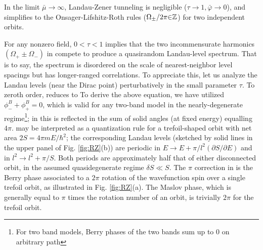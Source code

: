\documentclass[aps, prb, showpacs, twocolumn, notitlepage, superscriptaddress]{revtex4-1}
\begin{document}
In the limit $\bar{\mu}{\rightarrow} \infty$, Landau-Zener tunneling is negligible ($\tau{\rightarrow}1,\bar{\varphi}{\rightarrow}0$), and  simplifies to the Onsager-Lifshitz-Roth rules ($\Omega_{\pm}/2\pi{\in}\mathbb{Z}$) for  two independent orbits.

For any nonzero field, $0{<}\tau{<}1$ implies that the two incommensurate harmonics $(\Omega_+{\pm}\Omega_-)$ in  compete to produce a quasirandom Landau-level spectrum\cite{kaganov_coherent_1983}. That is to say, the spectrum is disordered on the scale of nearest-neighbor level spacings but has longer-ranged correlations. To appreciate this, let us analyze the Landau levels (near the Dirac point) perturbatively in the small parameter $\tau$. To zeroth order,  reduces to
To derive the above equation, we have utilized $\phi^B_-{+}\phi^B_+{=}0$, which is valid for any two-band model in the nearly-degenerate regime\footnote{For two band models, Berry phases of the two bands sum up to 0 on arbitrary path}; in  this is reflected in the sum of solid angles (at fixed energy) equalling $4\pi$.  may be interpreted as a quantization rule for a trefoil-shaped orbit with net area $2S{=}4\pi m E{/\hbar^2}$; the corresponding Landau levels (sketched by solid lines in the upper panel of Fig. \ref{fig:RZ}(b)) are periodic in $E{\rightarrow}E{+}\pi/l^2(\partial S/\partial E)$ and in $l^2{\rightarrow}l^2{+}\pi/S$. Both periods are approximately half that of either disconnected  orbit, in the assumed quasidegenerate regime $\delta S{\ll}S$. The $\pi$ correction in  is the Berry phase associated to a $2\pi$ rotation of the wavefunction spin over a single trefoil orbit, as illustrated in Fig. \ref{fig:RZ}(a). The Maslov phase, which is generally equal to $\pi$ times the rotation number of an orbit, is trivially $2\pi$ for the trefoil orbit.
\end{document}
